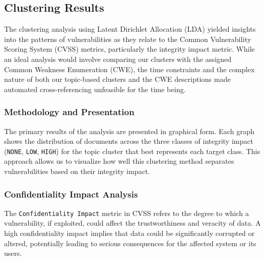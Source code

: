 \documentclass[12pt]{article}
\begin{document}
\subsection{Clustering Results}

The clustering analysis using Latent Dirichlet Allocation (LDA) yielded insights into the patterns
of vulnerabilities as they relate to the Common Vulnerability Scoring System (CVSS) metrics,
particularly the integrity impact metric. While an ideal analysis would involve comparing our
clusters with the assigned Common Weakness Enumeration (CWE), the time constraints and the complex
nature of both our topic-based clusters and the CWE descriptions made automated cross-referencing
unfeasible for the time being.

\subsubsection*{Methodology and Presentation}

The primary results of the analysis are presented in graphical form. Each graph shows the
distribution of documents across the three classes of integrity impact (\texttt{NONE}, \texttt{LOW},
\texttt{HIGH}) for the topic cluster that best represents each target class. This approach allows us
to visualize how well this clustering method separates vulnerabilities based on their integrity impact.



\subsubsection{Confidentiality Impact Analysis}

The \texttt{Confidentiality Impact} metric in CVSS refers to the degree to which a vulnerability, if exploited,
could affect the trustworthiness and veracity of data. A high confidentiality impact implies that data
could be significantly corrupted or altered, potentially leading to serious consequences for the
affected system or its users.
\end{document}
